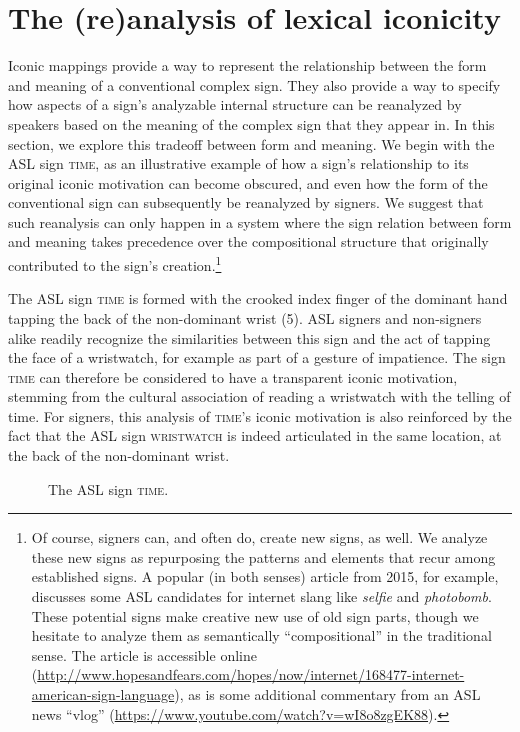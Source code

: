 \documentclass[output=paper,
modfonts
]{LSP/langsci}
\begin{document}
\section{The (re)analysis of lexical iconicity}\label{sec:3}
Iconic mappings provide a way to represent the relationship between the form and meaning of a conventional complex sign. They also provide a way to specify how aspects of a sign's analyzable internal structure can be reanalyzed by speakers based on the meaning of the complex sign that they appear in. In this section, we explore this tradeoff between form and meaning. We begin with the ASL sign \textsc{time,} as an illustrative example of how a sign's relationship to its original iconic motivation can become obscured, and even how the form of the conventional sign can subsequently be reanalyzed by signers. We suggest that such reanalysis can only happen in a system where the sign relation between form and meaning takes precedence over the compositional structure that originally contributed to the sign's creation.\footnote{ Of course, signers can, and often do, create new signs, as well. We analyze these new signs as repurposing the patterns and elements that recur among established signs. A popular (in both senses) article from 2015, for example, discusses some ASL candidates for internet slang like \textit{selfie} and \textit{photobomb}. These potential signs make creative new use of old sign parts, though we hesitate to analyze them as semantically ``compositional'' in the traditional sense. The article is accessible online (\url{http://www.hopesandfears.com/hopes/now/internet/168477-internet-american-sign-language}), as is some additional commentary from an ASL news ``vlog'' (\url{https://www.youtube.com/watch?v=wI8o8zgEK88}).} 

The ASL sign \textsc{time} is formed with the crooked index finger of the dominant hand tapping the back of the non-dominant wrist (5). ASL signers and non-signers alike readily recognize the similarities between this sign and the act of tapping the face of a wristwatch, for example as part of a gesture of impatience. The sign \textsc{time} can therefore be considered to have a transparent iconic motivation, stemming from the cultural association of reading a wristwatch with the telling of time. For signers, this analysis of \textsc{time}'s iconic motivation is also reinforced by the fact that the ASL sign \textsc{wristwatch} is indeed articulated in the same location, at the back of the non-dominant wrist.

\begin{figure}

\caption{The ASL sign \textsc{time}.}
\label{fig:5}

\end{figure}
\end{document}
